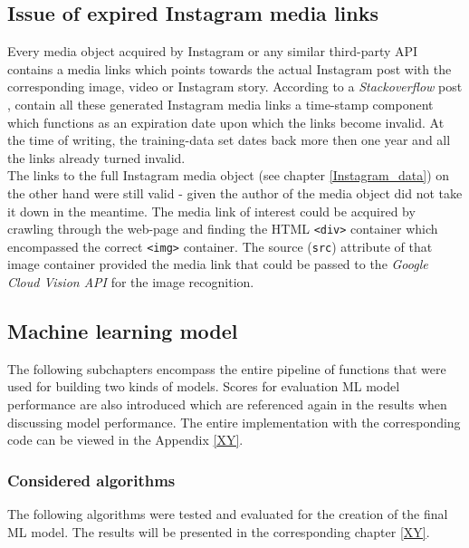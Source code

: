 \subsection{Issue of expired Instagram media links} \label{expired_media_links}
Every media object acquired by Instagram or any similar third-party API contains a media links which points towards the actual Instagram post with the corresponding image, video or Instagram story. According to a \textit{Stackoverflow} post \parencite{Wayne2018}, contain all these generated Instagram media links a time-stamp component which functions as an expiration date upon which the links become invalid. At the time of writing, the training-data set dates back more then one year and all the links already turned invalid.\\
\newline
The links to the full Instagram media object (see chapter \ref{Instagram_data}) on the other hand were still valid - given the author of the media object did not take it down in the meantime. The media link of interest could be acquired by crawling through the web-page and finding the HTML \texttt{<div>} container which encompassed the correct \texttt{<img>} container. The source (\texttt{src}) attribute of that image container provided the media link that could be passed to the \textit{Google Cloud Vision API} for the image recognition.

\subsection{Machine learning model} \label{ml_model}
The following subchapters encompass the entire pipeline of functions that were used for building two kinds of models. Scores for evaluation ML model performance are also introduced which are referenced again in the results when discussing model performance. The entire implementation with the corresponding code can be viewed in the Appendix \ref{XY}.

\subsubsection{Considered algorithms} \label{ml_algorithms}
The following algorithms were tested and evaluated for the creation of the final ML model. The results will be presented in the corresponding chapter \ref{XY}.

